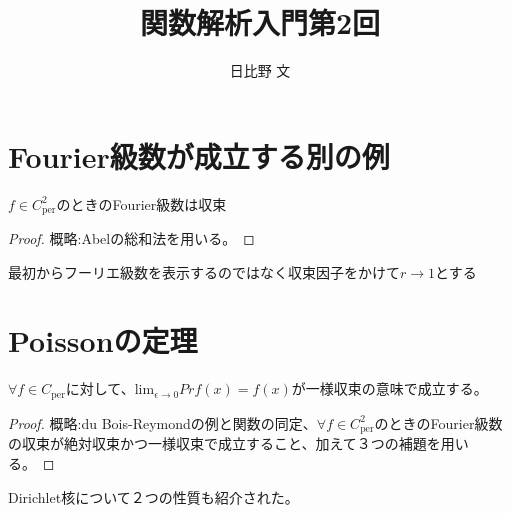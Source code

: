 \documentclass[12pt,a4paper]{ltjsarticle}
\begin{document}
\title{関数解析入門第2回}
\author{日比野 文}
\maketitle

\section{Fourier級数が成立する別の例}
\begin{thm}
	$f\in C^2_{\mathrm{per}}$のときのFourier級数は収束
\end{thm}
\begin{proof}
	概略:Abelの総和法を用いる。
\end{proof}
\begin{rem}
	最初からフーリエ級数を表示するのではなく収束因子をかけて$r\to 1$とする
\end{rem}

\section{Poissonの定理}
\begin{thm}[Poissonの定理]
	$\forall f \in C_{\mathrm{per}}$に対して、$\mathrm{lim}_{\epsilon \to 0} Prf(x)=f(x)$が一様収束の意味で成立する。
\end{thm}
\begin{proof}
	概略:du Bois-Reymondの例と関数の同定、$\forall f \in C^2_{\mathrm{per}}$のときのFourier級数の収束が絶対収束かつ一様収束で成立すること、加えて３つの補題を用いる。
\end{proof}

Dirichlet核について２つの性質も紹介された。
\end{document}
